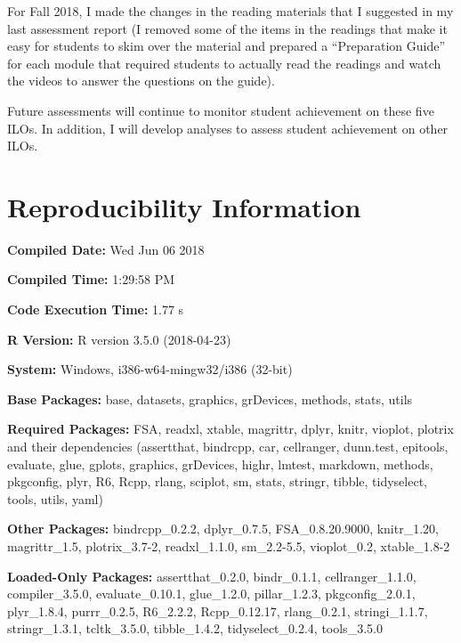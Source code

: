 \documentclass{article}\usepackage[]{graphicx}\usepackage[]{color}
\begin{document}
For Fall 2018, I made the changes in the reading materials that I suggested in my last assessment report (I removed some of the items in the readings that make it easy for students to skim over the material and prepared a ``Preparation Guide'' for each module that required students to actually read the readings and watch the videos to answer the questions on the guide).

Future assessments will continue to monitor student achievement on these five ILOs. In addition, I will develop analyses to assess student achievement on other ILOs.

\cleardoublepage
{}
\section*{Reproducibility Information}
\begin{Itemize}
  \item \textbf{Compiled Date:} Wed Jun 06 2018
  \item \textbf{Compiled Time:} 1:29:58 PM
  \item \textbf{Code Execution Time:} 1.77 s
  \item \textbf{R Version:} R version 3.5.0 (2018-04-23)
  \item \textbf{System:} Windows, i386-w64-mingw32/i386 (32-bit)
  \item \textbf{Base Packages:} base, datasets, graphics, grDevices, methods, stats, utils
  \item \textbf{Required Packages:} FSA, readxl, xtable, magrittr, dplyr, knitr, vioplot, plotrix and their dependencies (assertthat, bindrcpp, car, cellranger, dunn.test, epitools, evaluate, glue, gplots, graphics, grDevices, highr, lmtest, markdown, methods, pkgconfig, plyr, R6, Rcpp, rlang, sciplot, sm, stats, stringr, tibble, tidyselect, tools, utils, yaml)
  \item \textbf{Other Packages:} bindrcpp\_0.2.2, dplyr\_0.7.5, FSA\_0.8.20.9000, knitr\_1.20, magrittr\_1.5, plotrix\_3.7-2, readxl\_1.1.0, sm\_2.2-5.5, vioplot\_0.2, xtable\_1.8-2
  \item \textbf{Loaded-Only Packages:} assertthat\_0.2.0, bindr\_0.1.1, cellranger\_1.1.0, compiler\_3.5.0, evaluate\_0.10.1, glue\_1.2.0, pillar\_1.2.3, pkgconfig\_2.0.1, plyr\_1.8.4, purrr\_0.2.5, R6\_2.2.2, Rcpp\_0.12.17, rlang\_0.2.1, stringi\_1.1.7, stringr\_1.3.1, tcltk\_3.5.0, tibble\_1.4.2, tidyselect\_0.2.4, tools\_3.5.0
\end{Itemize}
\end{document}
